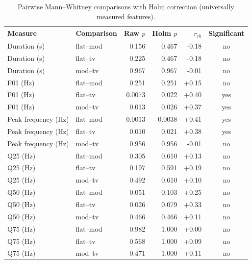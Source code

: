 \begin{table}[H]
\centering
\caption{Pairwise Mann--Whitney comparisons with Holm correction (universally measured features).}
\label{tab:p1pair}
\small
\begin{tabular}{llrrrc}
\toprule
Measure & Comparison & Raw $p$ & Holm $p$ & $r_{rb}$ & Significant \\
\midrule
Duration (s) & flat--mod & 0.156 & 0.467 & -0.18 & no \\
Duration (s) & flat--tv & 0.225 & 0.467 & -0.18 & no \\
Duration (s) & mod--tv & 0.967 & 0.967 & -0.01 & no \\
F01 (Hz) & flat--mod & 0.251 & 0.251 & +0.15 & no \\
F01 (Hz) & flat--tv & 0.0073 & 0.022 & +0.40 & yes \\
F01 (Hz) & mod--tv & 0.013 & 0.026 & +0.37 & yes \\
Peak frequency (Hz) & flat--mod & 0.0013 & 0.0038 & +0.41 & yes \\
Peak frequency (Hz) & flat--tv & 0.010 & 0.021 & +0.38 & yes \\
Peak frequency (Hz) & mod--tv & 0.956 & 0.956 & -0.01 & no \\
Q25 (Hz) & flat--mod & 0.305 & 0.610 & +0.13 & no \\
Q25 (Hz) & flat--tv & 0.197 & 0.591 & +0.19 & no \\
Q25 (Hz) & mod--tv & 0.492 & 0.610 & +0.10 & no \\
Q50 (Hz) & flat--mod & 0.051 & 0.103 & +0.25 & no \\
Q50 (Hz) & flat--tv & 0.026 & 0.079 & +0.33 & no \\
Q50 (Hz) & mod--tv & 0.466 & 0.466 & +0.11 & no \\
Q75 (Hz) & flat--mod & 0.982 & 1.000 & +0.00 & no \\
Q75 (Hz) & flat--tv & 0.568 & 1.000 & +0.09 & no \\
Q75 (Hz) & mod--tv & 0.471 & 1.000 & +0.11 & no \\
\bottomrule
\end{tabular}
\end{table}